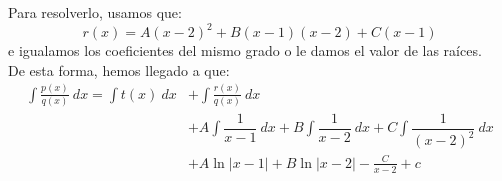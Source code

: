 Para resolverlo, usamos que:
\begin{equation*}
    r(x) = A{(x-2)}^{2} + B(x-1)(x-2) + C(x-1)
\end{equation*}
e igualamos los coeficientes del mismo grado o le damos el valor de las raíces.\\

\noindent
De esta forma, hemos llegado a que:
\begin{align*}
    \displaystyle\int \frac{p(x)}{q(x)}~dx  = \displaystyle\int t(x)~dx  &+ \displaystyle\int \frac{r(x)}{q(x)}~dx  \\
                                            &+ A \displaystyle\int \dfrac{1}{x-1}~dx  + B\displaystyle\int \dfrac{1}{x-2}~dx  + C\displaystyle\int \dfrac{1}{{(x-2)}^{2}}~dx \\
                                            &+ A\ln|x-1| + B\ln|x-2| -\frac{C}{x-2} + c
\end{align*}

